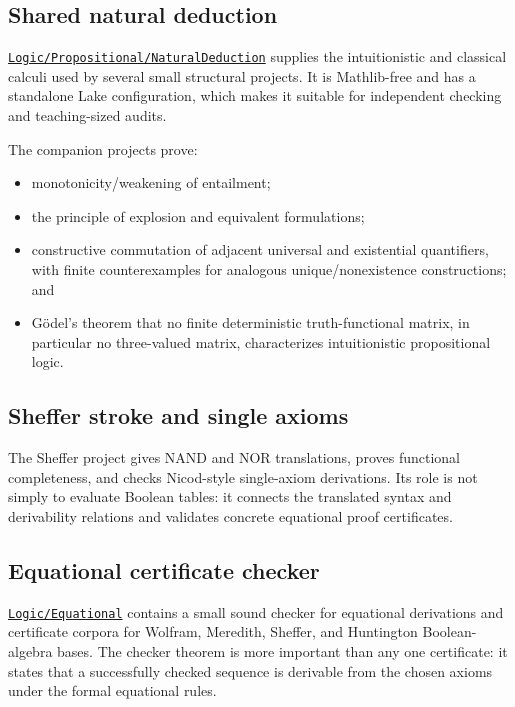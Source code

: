 \documentclass[
  10pt,
  a4paper,
  twoside,
  open=any,
  parskip=half,
  headings=big
]{scrreprt}
\newcommand{\CommitFull}{56a402bf82a9aab119fcbe3e96b991d387b221c5}
\newcommand{\RepoWeb}{https://github.com/VladimirReshetnikov/ProveIt}
\newcommand{\RepoTreeBase}{\RepoWeb/tree/\CommitFull}
\newcommand{\RepoDir}[1]{\href{\RepoTreeBase/#1}{\nolinkurl{#1}}}
\begin{document}
\subsection{Shared natural deduction}

\RepoDir{Logic/Propositional/NaturalDeduction} supplies the intuitionistic and classical calculi used by several small structural projects. It is Mathlib-free and has a standalone Lake configuration, which makes it suitable for independent checking and teaching-sized audits.

The companion projects prove:

\begin{itemize}
  \item monotonicity/weakening of entailment;
  \item the principle of explosion and equivalent formulations;
  \item constructive commutation of adjacent universal and existential quantifiers, with finite counterexamples for analogous unique/nonexistence constructions; and
  \item G\"odel's theorem that no finite deterministic truth-functional matrix, in particular no three-valued matrix, characterizes intuitionistic propositional logic.
\end{itemize}

\subsection{Sheffer stroke and single axioms}

The Sheffer project gives NAND and NOR translations, proves functional completeness, and checks Nicod-style single-axiom derivations. Its role is not simply to evaluate Boolean tables: it connects the translated syntax and derivability relations and validates concrete equational proof certificates.

\subsection{Equational certificate checker}

\RepoDir{Logic/Equational} contains a small sound checker for equational derivations and certificate corpora for Wolfram, Meredith, Sheffer, and Huntington Boolean-algebra bases. The checker theorem is more important than any one certificate: it states that a successfully checked sequence is derivable from the chosen axioms under the formal equational rules.
\end{document}
